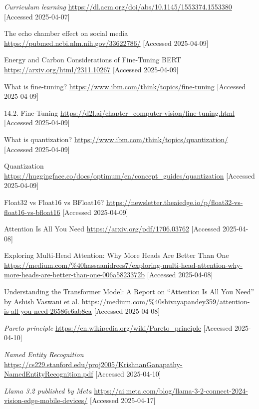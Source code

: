 \documentclass[licencjacka,en]{pracamgr}
\begin{document}
\begin{thebibliography}{99}
\textit{Curriculum learning}
\url{https://dl.acm.org/doi/abs/10.1145/1553374.1553380}
[Accessed 2025-04-07]

The echo chamber effect on social media
\url{https://pubmed.ncbi.nlm.nih.gov/33622786/}
[Accessed 2025-04-09]

Energy and Carbon Considerations of Fine-Tuning BERT
\url{https://arxiv.org/html/2311.10267}
[Accessed 2025-04-09]

What is fine-tuning?
\url{https://www.ibm.com/think/topics/fine-tuning}
[Accessed 2025-04-09]

14.2. Fine-Tuning
\url{https://d2l.ai/chapter_computer-vision/fine-tuning.html}
[Accessed 2025-04-09]

What is quantization?
\url{https://www.ibm.com/think/topics/quantization/}
[Accessed 2025-04-09]

Quantization
\url{https://huggingface.co/docs/optimum/en/concept_guides/quantization}
[Accessed 2025-04-09]

Float32 vs Float16 vs BFloat16?
\url{https://newsletter.theaiedge.io/p/float32-vs-float16-vs-bfloat16}
[Accessed 2025-04-09]

Attention Is All You Need
\url{https://arxiv.org/pdf/1706.03762}
[Accessed 2025-04-08]

Exploring Multi-Head Attention: Why More Heads Are Better Than One
\url{https://medium.com/%40hassaanidrees7/exploring-multi-head-attention-why-more-heads-are-better-than-one-006a5823372b}
[Accessed 2025-04-08]

Understanding the Transformer Model: A Report on “Attention Is All You Need” by Ashish Vaswani et al.
\url{https://medium.com/%40shivayapandey359/attention-is-all-you-need-26586e6ab8ca}
[Accessed 2025-04-08]

\textit{Pareto principle}
\url{https://en.wikipedia.org/wiki/Pareto_principle}
[Accessed 2025-04-10]

\textit{Named Entity Recognition}
\url{https://cs229.stanford.edu/proj2005/KrishnanGanapathy-NamedEntityRecognition.pdf}
[Accessed 2025-04-10]

\textit{Llama 3.2 published by Meta}
\url{https://ai.meta.com/blog/llama-3-2-connect-2024-vision-edge-mobile-devices/}
[Accessed 2025-04-17]


\end{thebibliography}
\end{document}
